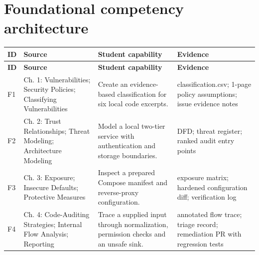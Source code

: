 \documentclass[10pt,letterpaper]{article}
\begin{document}
\section{Foundational competency architecture}
\begingroup\footnotesize\setlength\tabcolsep{3pt}
\begin{longtable}{>{\raggedright\arraybackslash}p{}>{\raggedright\arraybackslash}p{}>{\raggedright\arraybackslash}p{}>{\raggedright\arraybackslash}p{}}\toprule
\textbf{ID} & \textbf{Source} & \textbf{Student capability} & \textbf{Evidence}\\\midrule\endfirsthead
\toprule \textbf{ID} & \textbf{Source} & \textbf{Student capability} & \textbf{Evidence}\\\midrule\endhead
F1 & Ch. 1: Vulnerabilities; Security Policies; Classifying Vulnerabilities & Create an evidence-based classification for six local code excerpts. & classification.csv; 1-page policy assumptions; issue evidence notes\\\midrule
F2 & Ch. 2: Trust Relationships; Threat Modeling; Architecture Modeling & Model a local two-tier service with authentication and storage boundaries. & DFD; threat register; ranked audit entry points\\\midrule
F3 & Ch. 3: Exposure; Insecure Defaults; Protective Measures & Inspect a prepared Compose manifest and reverse-proxy configuration. & exposure matrix; hardened configuration diff; verification log\\\midrule
F4 & Ch. 4: Code-Auditing Strategies; Internal Flow Analysis; Reporting & Trace a supplied input through normalization, permission checks and an unsafe sink. & annotated flow trace; triage record; remediation PR with regression tests\\\midrule
\bottomrule\end{longtable}\endgroup
\end{document}
